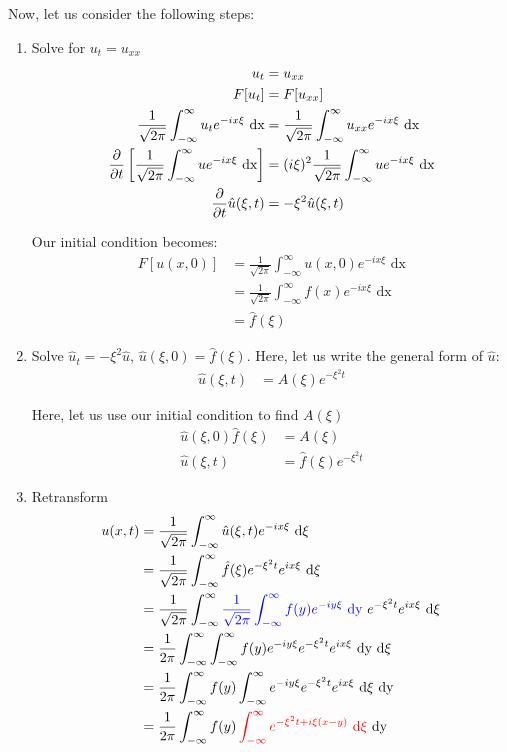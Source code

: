 Now, let us consider the following steps:
%
\begin{enumerate}
  \item Solve for $u_t = u_{xx}$
  \begin{align}
    u_t & = u_{xx}\\
    F[u_t] & = F[u_{xx}]\\
    \frac{1}{\sqrt{2 \pi}} \int^\infty_{-\infty} u_t e^{-i x \xi} \text{ dx} & = \frac{1}{\sqrt{2 \pi}} \int^\infty_{-\infty} u_{xx} e^{-i x \xi} \text{ dx}\\
    \frac{\partial}{\partial t} \left[ \frac{1}{\sqrt{2 \pi}} \int^\infty_{-\infty} u e^{-i x \xi} \text{ dx} \right]
    & = (i \xi)^2 \frac{1}{\sqrt{2 \pi}} \int^\infty_{-\infty} u e^{-i x \xi} \text{ dx}\\
    \frac{\partial}{\partial t} \hat u(\xi, t) & = - \xi^2 \hat u(\xi, t)
  \end{align}

  Our initial condition becomes:
  \begin{align}
    F[u(x, 0)] & = \frac{1}{\sqrt{2 \pi}} \int^\infty_{-\infty} u(x, 0) e^{-i x \xi} \text{ dx}\\
    & = \frac{1}{\sqrt{2 \pi}} \int^\infty_{-\infty} f(x) e^{-i x \xi} \text{ dx}\\
    & = \hat f(\xi)
  \end{align}
  \item Solve $\hat u_t = -\xi^2 \hat u$, $\hat u(\xi, 0) = \hat f(\xi)$. Here, let us write the general form of $\hat u$:
  \begin{align}
    \hat u(\xi, t) & = A(\xi) e^{- \xi^2 t}
  \end{align}

  Here, let us use our initial condition to find $A(\xi)$
  \begin{align}
    \hat u (\xi, 0) \hat f(\xi) & = A(\xi)\\
    \hat u(\xi, t) & = \hat f(\xi) e^{-\xi^2 t}
  \end{align}

  \item Retransform
  \begin{align}
    u(x, t) & = \frac{1}{\sqrt{2 \pi}} \int^\infty_{-\infty} \hat u(\xi, t) e^{-i x \xi} \text{ d}\xi\\
    & = \frac{1}{\sqrt{2 \pi}} \int^\infty_{-\infty} \hat f(\xi) e^{-\xi^2 t}e^{i x \xi} \text{ d}\xi\\
    & = \frac{1}{\sqrt{2 \pi}} \int^\infty_{-\infty}
    \color{blue}{\frac{1}{\sqrt{2 \pi}} \int^\infty_{-\infty} f(y) e^{-i y \xi} \text{ dy}} \ \color{black}
    e^{-\xi^2 t} e^{i x \xi} \text{ d}\xi\\
    & = \frac{1}{2 \pi} \int^\infty_{-\infty} \int^\infty_{-\infty}
    f(y)e^{-i y \xi} e^{-\xi^2 t} e^{i x \xi} \text{ dy d}\xi\\
    & = \frac{1}{2 \pi} \int^\infty_{-\infty} f(y)
    \int^\infty_{-\infty} e^{-i y \xi} e^{-\xi^2 t} e^{i x \xi} \text{ d}\xi \text{ dy}\\
    & = \frac{1}{2 \pi}
    \int^\infty_{-\infty} f(y)
    \color{red}
    \int^\infty_{-\infty} e^{-\xi^2 t + i \xi(x - y)} \text{ d}\xi
    \color{black}
    \text{ dy}
  \end{align}


\end{enumerate}
